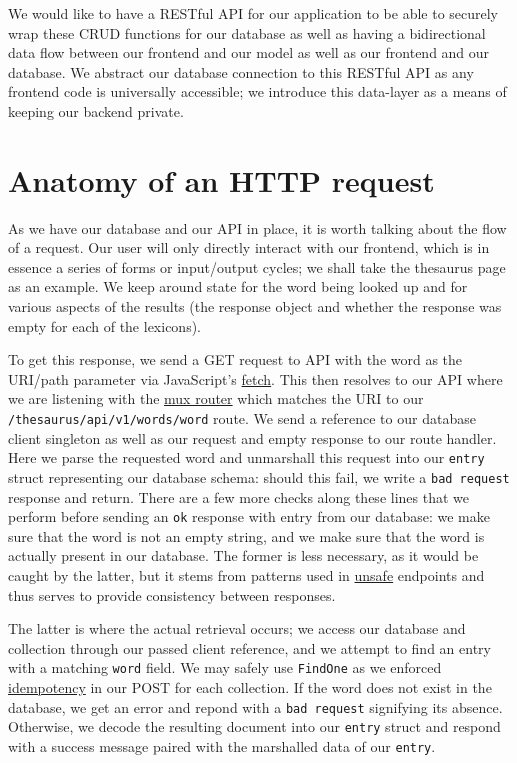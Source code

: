 \documentclass[11pt, twoside, reqno]{book}
\begin{document}
We would like to have a RESTful API for our application to be able to securely wrap these CRUD functions for our database as well as having a bidirectional data flow between our frontend and our model as well as our frontend and our database. We abstract our database connection to this RESTful API as any frontend code is universally accessible; we introduce this data-layer as a means of keeping our backend private.

\section{Anatomy of an HTTP request}

As we have our database and our API in place, it is worth talking about the flow of a request. Our user will only directly interact with our frontend, which is in essence a series of forms or input/output cycles; we shall take the thesaurus page as an example. We keep around state for the word being looked up and for various aspects of the results (the response object and whether the response was empty for each of the lexicons).

To get this response, we send a GET request to API with the word as the URI/path parameter via JavaScript's \href{https://developer.mozilla.org/en-US/docs/Web/API/Fetch_API}{fetch}. This then resolves to our API where we are listening with the \href{http://www.gorillatoolkit.org/pkg/mux}{mux router} which matches the URI to our \texttt{/thesaurus/api/v1/words/{word}} route. We send a reference to our database client singleton as well as our request and empty response to our route handler. Here we parse the requested word and unmarshall this request into our \texttt{entry} struct representing our database schema: should this fail, we write a \texttt{bad request} response and return. There are a few more checks along these lines that we perform before sending an \texttt{ok} response with entry from our database: we make sure that the word is not an empty string, and we make sure that the word is actually present in our database. The former is less necessary, as it would be caught by the latter, but it stems from patterns used in \href{https://developer.mozilla.org/en-US/docs/Glossary/safe}{unsafe} endpoints and thus serves to provide consistency between responses.

The latter is where the actual retrieval occurs; we access our database and collection through our passed client reference, and we attempt to find an entry with a matching \texttt{word} field. We may safely use \texttt{FindOne} as we enforced \href{https://developer.mozilla.org/en-US/docs/Glossary/idempotent}{idempotency} in our POST for each collection. If the word does not exist in the database, we get an error and repond with a \texttt{bad request} signifying its absence. Otherwise, we decode the resulting document into our \texttt{entry} struct and respond with a success message paired with the marshalled data of our \texttt{entry}.
\end{document}
